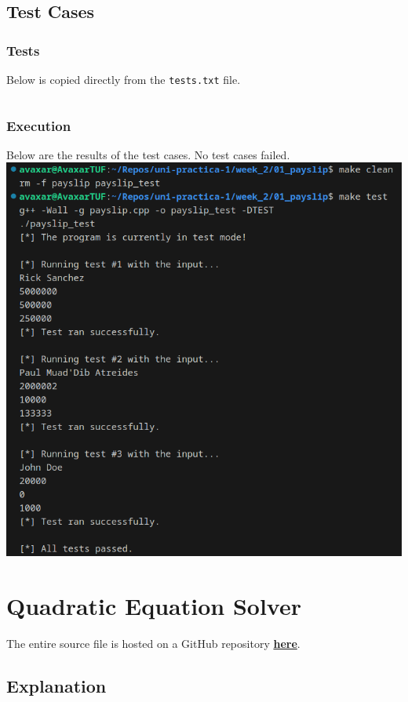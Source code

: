 \documentclass[12pt]{article}
\begin{document}
\subsection{Test Cases}

\subsubsection{Tests}
Below is copied directly from the \texttt{tests.txt} file.
\inputminted{text}{01_payslip/tests.txt}

\subsubsection{Execution}
Below are the results of the test cases. No test cases failed.
\newline\includegraphics[width=\textwidth]{01_payslip_test}

\pagebreak
\section{Quadratic Equation Solver}
The entire source file is hosted on a GitHub repository \href{https://github.com/avaxar/uni-practica-1/tree/main/week_2/02_quadratic}{\textbf{here}}.

\subsection{Explanation}
\end{document}
